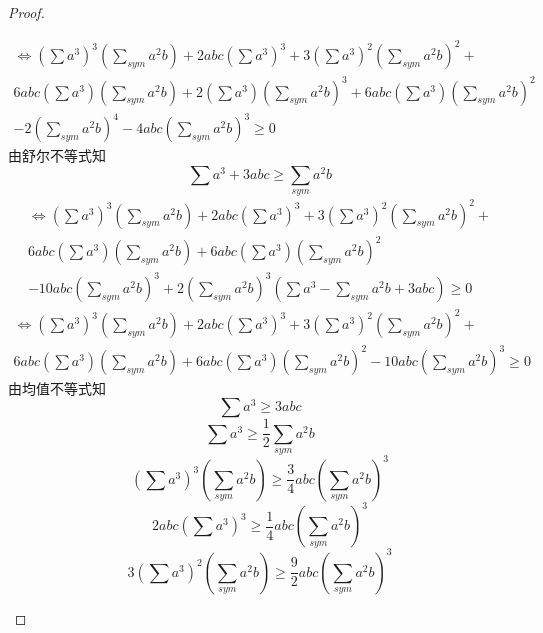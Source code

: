 \documentclass[]{article}
\begin{document}
{\begin{proof}
\begin{enumerate}
\begin{equation}
    \begin{split}
        \Longleftrightarrow (\sum a^3)^3(\sum_{sym}a^2b)+2abc(\sum a^3)^3+3(\sum a^3)^2(\sum_{sym}a^2b)^2+\\6abc(\sum a^3)(\sum_{sym}a^2b)+2(\sum a^3)(\sum_{sym}a^2b)^3+6abc(\sum a^3)(\sum_{sym}a^2b)^2\\-2(\sum_{sym}a^2b)^4-4abc(\sum_{sym}a^2b)^3\geq 0
    \end{split}
    \end{equation}
    由舒尔不等式知
    \begin{equation}\nonumber
        \sum a^3+3abc\geq \sum\limits_{sym}a^2b
    \end{equation}
     \begin{equation}\nonumber
    \begin{split}
        \Longleftrightarrow (\sum a^3)^3(\sum_{sym}a^2b)+2abc(\sum a^3)^3+3(\sum a^3)^2(\sum_{sym}a^2b)^2+\\6abc(\sum a^3)(\sum_{sym}a^2b)+6abc(\sum a^3)(\sum_{sym}a^2b)^2\\-10abc(\sum_{sym}a^2b)^3+2(\sum_{sym}a^2b)^3(\sum a^3-\sum_{sym}a^2b+3abc)\geq 0
    \end{split}
    \end{equation}   
    \begin{equation}\nonumber
    \begin{split}
         \Longleftrightarrow (\sum a^3)^3(\sum_{sym}a^2b)+2abc(\sum a^3)^3+3(\sum a^3)^2(\sum_{sym}a^2b)^2+\\6abc(\sum a^3)(\sum_{sym}a^2b)+6abc(\sum a^3)(\sum_{sym}a^2b)^2-10abc(\sum_{sym}a^2b)^3\geq 0
    \end{split}
    \end{equation}
    由均值不等式知
    \begin{equation}\nonumber
        \sum a^3\geq 3abc
    \end{equation}
    \begin{equation}\nonumber
        \sum a^3 \geq \frac{1}{2}\sum_{sym}a^2b
    \end{equation}
    \begin{equation}\nonumber
        (\sum a^3)^3(\sum_{sym}a^2b)\geq \frac{3}{4}abc(\sum_{sym}a^2b)^3
    \end{equation}
    \begin{equation}\nonumber
        2abc(\sum a^3)^3\geq \frac{1}{4}abc(\sum_{sym}a^2b)^3
    \end{equation}
    \begin{equation}\nonumber
        3(\sum a^3)^2(\sum_{sym}a^2b)\geq \frac{9}{2}abc(\sum_{sym}a^2b)^3

\end{equation}
\end{enumerate}
\end{proof}}
\end{document}

